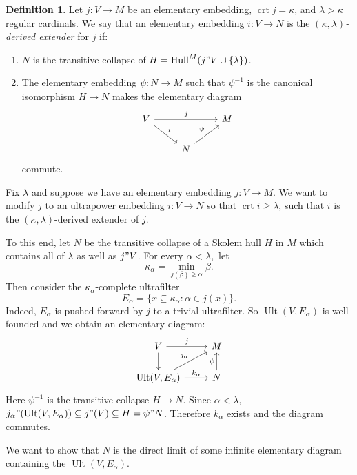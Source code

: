 \documentclass[12pt]{report}
\DeclareMathOperator{\Hull}{Hull}
\DeclareMathOperator{\crt}{crt}
\DeclareMathOperator{\Ult}{Ult}
\newcommand{\dfn}[1]{\emph{#1}\index{#1}}
\theoremstyle{definition}
\newtheorem{definition}[theorem]{Definition}
\begin{document}
\begin{definition}
Let $j: V \to M$ be an elementary embedding, $\crt j = \kappa$, and $\lambda > \kappa$ regular cardinals. We say that an elementary embedding $i: V \to N$ is the \dfn{$(\kappa, \lambda)$-derived extender} for $j$ if:
\begin{enumerate}
\item $N$ is the transitive collapse of $H = \Hull^M(j"V\cup\{\lambda\})$.
\item The elementary embedding $\psi: N \to M$ such that $\psi^{-1}$ is the canonical isomorphism $H \to N$ makes the elementary diagram
$$\begin{tikzcd}
V \arrow[rr,"j"] \arrow[dr,"i"] && M\\
& N \arrow[ur,"\psi"]\end{tikzcd}$$
commute.
\end{enumerate}
\end{definition}
Fix $\lambda$ and suppose we have an elementary embedding $j: V \to M$.
We want to modify $j$ to an ultrapower embedding $i: V \to N$ so that $\crt i \geq \lambda$, such that $i$ is the $(\kappa, \lambda)$-derived extender of $j$.

To this end, let $N$ be the transitive collapse of a Skolem hull $H$ in $M$ which contains all of $\lambda$ as well as $j"V$.
For every $\alpha < \lambda,$ let
$$\kappa_\alpha = \min_{j(\beta) \geq \alpha} \beta.$$
Then consider the $\kappa_\alpha$-complete ultrafilter
$$E_\alpha = \{x \subseteq \kappa_\alpha: \alpha \in j(x)\}.$$
Indeed, $E_\alpha$ is pushed forward by $j$ to a trivial ultrafilter.
So $\Ult(V, E_\alpha)$ is well-founded and we obtain an elementary diagram:
$$\begin{tikzcd}V \arrow[r,"j"] \arrow[d] & M\\
\Ult(V, E_\alpha) \arrow[ur,"j_\alpha"] \arrow[r, "k_\alpha"]& N \arrow[u,"\psi"]
\end{tikzcd}$$
Here $\psi^{-1}$ is the transitive collapse $H \to N$. Since $\alpha < \lambda$, $j_\alpha"(\Ult(V, E_\alpha)) \subseteq j"(V) \subseteq H = \psi"N$. Therefore $k_\alpha$ exists and the diagram commutes.

We want to show that $N$ is the direct limit of some infinite elementary diagram containing the $\Ult(V, E_\alpha)$.
\end{document}
